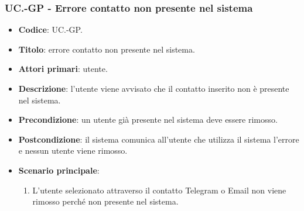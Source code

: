 			\subsubsection{UC\theuccount.\thesubuccount-GP - Errore contatto non presente nel sistema}

				\begin{itemize}
					\item \textbf{Codice}: UC\theuccount.\thesubuccount-GP.
					\item \textbf{Titolo}: errore contatto non presente nel sistema.
					\item \textbf{Attori primari}: utente.
					\item \textbf{Descrizione}: l’utente viene avvisato che il contatto inserito non è presente nel sistema.
					\item \textbf{Precondizione}: un utente già presente nel sistema deve essere rimosso.
					\item \textbf{Postcondizione}: il sistema comunica all’utente che utilizza il sistema l’errore e nessun utente viene rimosso.
					\item \textbf{Scenario principale}:
					\begin{enumerate}
						\item L'utente selezionato attraverso il contatto Telegram o Email non viene rimosso perché non presente nel sistema.
					\end{enumerate}
				\end{itemize}
